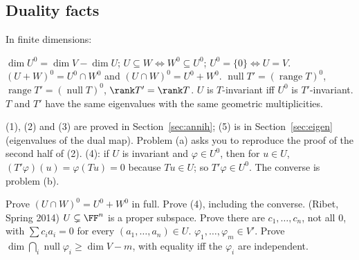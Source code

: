 \documentclass[10pt]{scrartcl}
\DeclareMathOperator{\nul}{null}
\DeclareMathOperator{\range}{range}
\begin{document}
\subsection{Duality facts}
\begin{theorem*}[T8]
  In finite dimensions:
  \begin{enumerate}
    \ii $\dim U^0=\dim V-\dim U$; $U\subseteq W\iff W^0\subseteq U^0$; $U^0=\{0\}\iff U=V$.
    \ii $(U+W)^0=U^0\cap W^0$ and $(U\cap W)^0=U^0+W^0$.
    \ii $\nul T'=(\range T)^0$, $\range T'=(\nul T)^0$, $\rank T'=\rank T$.
    \ii $U$ is $T$-invariant iff $U^0$ is $T'$-invariant.
    \ii $T$ and $T'$ have the same eigenvalues with the same geometric multiplicities.
  \end{enumerate}
\end{theorem*}
\why (1), (2) and (3) are proved in Section~\ref{sec:annih}; (5) is in Section~\ref{sec:eigen} (eigenvalues of the dual map). Problem (a) asks you to reproduce the proof of the second half of (2).
(4): if $U$ is invariant and $\varphi\in U^0$, then for $u\in U$, $(T'\varphi)(u)=\varphi(Tu)=0$ because $Tu\in U$; so $T'\varphi\in U^0$. The converse is problem (b).
\probs
\begin{enumerate}[(a)]
  \ii Prove $(U\cap W)^0=U^0+W^0$ in full.
  \ii Prove (4), including the converse.
  \ii (Ribet, Spring 2014) $U\subsetneq\FF^n$ is a proper subspace. Prove there are $c_1,\dots,c_n$, not all $0$, with $\sum c_ia_i=0$ for every $(a_1,\dots,a_n)\in U$.
  \ii $\varphi_1,\dots,\varphi_m\in V'$. Prove $\dim\bigcap_i\nul\varphi_i\ge\dim V-m$, with equality iff the $\varphi_i$ are independent.
\end{enumerate}
\end{document}
